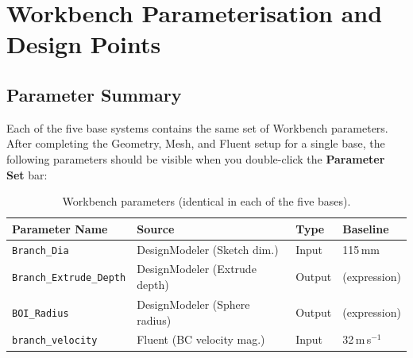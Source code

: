 \documentclass[12pt,a4paper]{report}
\begin{document}
\medskip
\noindent{}


\chapter{Workbench Parameterisation and Design Points}
\label{ch:param}

\section{Parameter Summary}

Each of the five base systems contains the same set of Workbench
parameters.  After completing the Geometry, Mesh, and Fluent setup for
a single base, the following parameters should be visible when you
double-click the \textbf{Parameter Set} bar:

\begin{table}[H]
\centering
\caption{Workbench parameters (identical in each of the five bases).}
\label{tab:allparams}
\begin{tabular}{@{}llll@{}}
\toprule
\textbf{Parameter Name} & \textbf{Source} & \textbf{Type} & \textbf{Baseline} \\
\midrule
\texttt{Branch\_Dia}            & DesignModeler (Sketch dim.)    & Input  & 115\,mm \\
\texttt{Branch\_Extrude\_Depth} & DesignModeler (Extrude depth)  & Output & (expression) \\
\texttt{BOI\_Radius}            & DesignModeler (Sphere radius)  & Output & (expression) \\
\texttt{branch\_velocity}       & Fluent (BC velocity mag.)      & Input  & 32\,m\,s$^{-1}$ \\
\bottomrule
\end{tabular}
\end{table}
\end{document}
